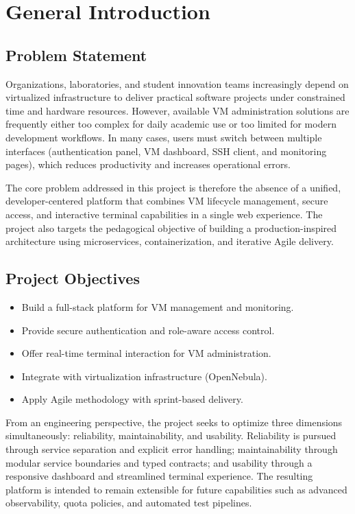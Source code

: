 \documentclass[12pt,a4paper]{report}
\begin{document}
\tableofcontents
\listoffigures
\listoftables
\clearpage


\chapter{General Introduction}
\section{Problem Statement}
Organizations, laboratories, and student innovation teams increasingly depend on virtualized infrastructure to deliver practical software projects under constrained time and hardware resources.
However, available VM administration solutions are frequently either too complex for daily academic use or too limited for modern development workflows.
In many cases, users must switch between multiple interfaces (authentication panel, VM dashboard, SSH client, and monitoring pages), which reduces productivity and increases operational errors.

The core problem addressed in this project is therefore the absence of a unified, developer-centered platform that combines VM lifecycle management, secure access, and interactive terminal capabilities in a single web experience.
The project also targets the pedagogical objective of building a production-inspired architecture using microservices, containerization, and iterative Agile delivery.

\section{Project Objectives}
\begin{itemize}[leftmargin=*]
    \item Build a full-stack platform for VM management and monitoring.
    \item Provide secure authentication and role-aware access control.
    \item Offer real-time terminal interaction for VM administration.
    \item Integrate with virtualization infrastructure (OpenNebula).
    \item Apply Agile methodology with sprint-based delivery.
\end{itemize}

From an engineering perspective, the project seeks to optimize three dimensions simultaneously: reliability, maintainability, and usability.
Reliability is pursued through service separation and explicit error handling; maintainability through modular service boundaries and typed contracts; and usability through a responsive dashboard and streamlined terminal experience.
The resulting platform is intended to remain extensible for future capabilities such as advanced observability, quota policies, and automated test pipelines.
\end{document}
